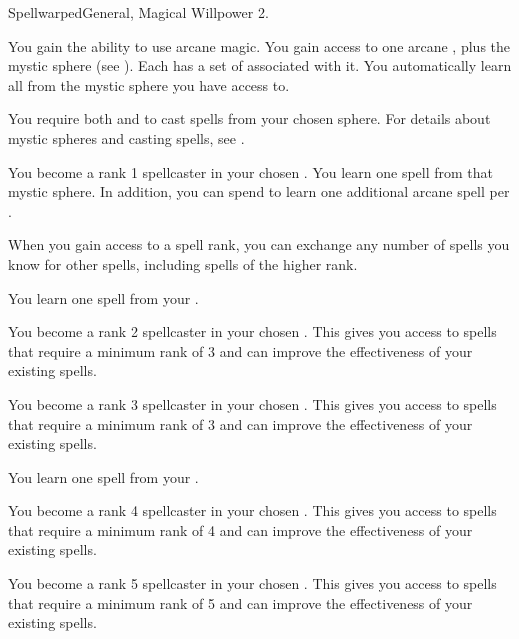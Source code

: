   \begin{magicalfeat}{Spellwarped}{General, Magical}
    \featpre Willpower 2.

     You gain the ability to use arcane magic.
    You gain access to one arcane , plus the  mystic sphere (see ).
    Each  has a set of  associated with it.
    You automatically learn all  from the mystic sphere you have access to.

    You require both  and  to cast spells from your chosen sphere.
    For details about mystic spheres and casting spells, see .

     You become a rank 1 spellcaster in your chosen .
    You learn one spell from that mystic sphere.
    In addition, you can spend  to learn one additional arcane spell per .

    When you gain access to a spell rank,
    you can exchange any number of spells you know for other spells,
    including spells of the higher rank.

     You learn one spell from your .

     You become a rank 2 spellcaster in your chosen .
    This gives you access to spells that require a minimum rank of 3 and can improve the effectiveness of your existing spells.

     You become a rank 3 spellcaster in your chosen .
    This gives you access to spells that require a minimum rank of 3 and can improve the effectiveness of your existing spells.

     You learn one spell from your .

     You become a rank 4 spellcaster in your chosen .
    This gives you access to spells that require a minimum rank of 4 and can improve the effectiveness of your existing spells.

     You become a rank 5 spellcaster in your chosen .
    This gives you access to spells that require a minimum rank of 5 and can improve the effectiveness of your existing spells.


\end{magicalfeat}
